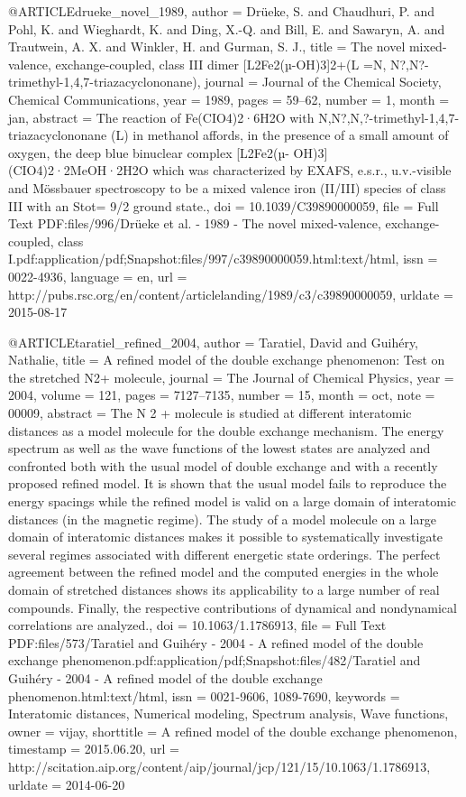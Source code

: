 @ARTICLE{drueke_novel_1989,
  author = {Dr\"ueke, S. and Chaudhuri, P. and Pohl, K. and Wieghardt, K. and Ding,
	X.-Q. and Bill, E. and Sawaryn, A. and Trautwein, A. X. and Winkler,
	H. and Gurman, S. J.},
  title = {The novel mixed-valence, exchange-coupled, class {III} dimer [{L}2Fe2(µ-{OH})3]2+({L}
	={N}, {N}?,{N}?-trimethyl-1,4,7-triazacyclononane)},
  journal = {Journal of the Chemical Society, Chemical Communications},
  year = {1989},
  pages = {59--62},
  number = {1},
  month = jan,
  abstract = {The reaction of Fe(CIO4)2·6H2O with N,N?,N,?-trimethyl-1,4,7-triazacyclononane
	(L) in methanol affords, in the presence of a small amount of oxygen,
	the deep blue binuclear complex [L2Fe2(µ- OH)3](CIO4)2·2MeOH·2H2O
	which was characterized by EXAFS, e.s.r., u.v.-visible and Mössbauer
	spectroscopy to be a mixed valence iron (II/III) species of class
	III with an Stot= 9/2 ground state.},
  doi = {10.1039/C39890000059},
  file = {Full Text PDF:files/996/Drüeke et al. - 1989 - The novel mixed-valence, exchange-coupled,     class I.pdf:application/pdf;Snapshot:files/997/c39890000059.html:text/html},
  issn = {0022-4936},
  language = {en},
  url = {http://pubs.rsc.org/en/content/articlelanding/1989/c3/c39890000059},
  urldate = {2015-08-17}
}

@ARTICLE{taratiel_refined_2004,
  author = {Taratiel, David and Guih{\'e}ry, Nathalie},
  title = {A refined model of the double exchange phenomenon: {Test} on the
	stretched {N}2+ molecule},
  journal = {The Journal of Chemical Physics},
  year = {2004},
  volume = {121},
  pages = {7127--7135},
  number = {15},
  month = oct,
  note = {00009},
  abstract = {The N 2 + molecule is studied at different interatomic distances as
	a model molecule for the double exchange mechanism. The energy spectrum
	as well as the wave functions of the lowest states are analyzed and
	confronted both with the usual model of double exchange and with
	a recently proposed refined model. It is shown that the usual model
	fails to reproduce the energy spacings while the refined model is
	valid on a large domain of interatomic distances (in the magnetic
	regime). The study of a model molecule on a large domain of interatomic
	distances makes it possible to systematically investigate several
	regimes associated with different energetic state orderings. The
	perfect agreement between the refined model and the computed energies
	in the whole domain of stretched distances shows its applicability
	to a large number of real compounds. Finally, the respective contributions
	of dynamical and nondynamical correlations are analyzed.},
  doi = {10.1063/1.1786913},
  file = {Full Text PDF:files/573/Taratiel and Guihéry - 2004 - A refined model of the double exchange phenomenon.pdf:application/pdf;Snapshot:files/482/Taratiel and Guihéry - 2004 - A refined model of the double exchange phenomenon.html:text/html},
  issn = {0021-9606, 1089-7690},
  keywords = {Interatomic distances, Numerical modeling, Spectrum analysis, Wave
	functions},
  owner = {vijay},
  shorttitle = {A refined model of the double exchange phenomenon},
  timestamp = {2015.06.20},
  url = {http://scitation.aip.org/content/aip/journal/jcp/121/15/10.1063/1.1786913},
  urldate = {2014-06-20}
}

